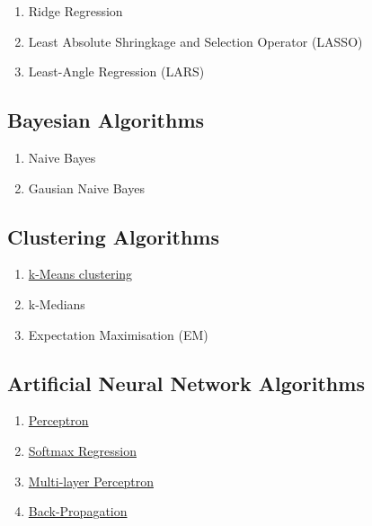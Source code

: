  \begin{enumerate}
   \item  Ridge Regression  

   \item  Least Absolute Shringkage and Selection Operator (LASSO) 

   \item  Least-Angle Regression (LARS) 
 \end{enumerate}
 
 
\subsection{Bayesian Algorithms}
 \begin{enumerate}
   \item Naive Bayes 

   \item Gausian Naive Bayes  
 \end{enumerate}
 
 
\subsection{Clustering Algorithms}
\begin{enumerate}
  \item \href{http://machinelearningcoban.com/2017/01/01/kmeans/}{k-Means clustering}  

  \item k-Medians  

  \item Expectation Maximisation (EM)  
\end{enumerate}
 
 
\subsection{Artificial Neural Network Algorithms }
\begin{enumerate}
  \item \href{http://machinelearningcoban.com/2017/01/21/perceptron/}{Perceptron} 

  \item \href{http://machinelearningcoban.com/2017/02/17/softmax/}{Softmax Regression} 

  \item  \href{http://machinelearningcoban.com/2017/02/24/mlp/}{Multi-layer Perceptron} 

  \item \href{http://machinelearningcoban.com/2017/02/24/mlp/#-backpropagation}{Back-Propagation } 
 
\end{enumerate}
 
